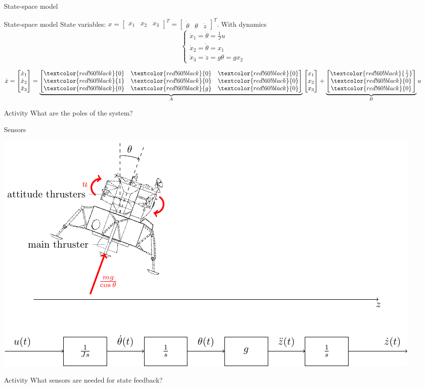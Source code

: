 \documentclass[presentation,aspectratio=169]{beamer}
\begin{document}
\begin{frame}[label={sec:org83769fd}]{State-space model}
\end{frame}
\begin{frame}[label={sec:org56fdffb}]{State-space model}
State variables: \(x = \begin{bmatrix} x_1 & x_2 & x_3 \end{bmatrix}^T = \begin{bmatrix} \dot{\theta} & \theta & \dot{z} \end{bmatrix}^T\). With dynamics
\[ \begin{cases} \dot{x}_1 =  \ddot{\theta} = \frac{1}{J} u\\ \dot{x}_2 = \dot{\theta} = x_1\\ \dot{x}_3 = \ddot{z} = g\theta = gx_2 \end{cases} \]

\[ \dot{x} = \begin{bmatrix} \dot{x}_1\\\dot{x}_2\\\dot{x}_3\end{bmatrix} = \underbrace{\begin{bmatrix} \textcolor{red!60!black}{0} & \textcolor{red!60!black}{0} &\textcolor{red!60!black}{0} \\\textcolor{red!60!black}{1} & \textcolor{red!60!black}{0}& \textcolor{red!60!black}{0}\\ \textcolor{red!60!black}{0}& \textcolor{red!60!black}{g} &\textcolor{red!60!black}{0} \end{bmatrix}}_{A} \begin{bmatrix} x_1\\x_2\\x_3\end{bmatrix} + \underbrace{\begin{bmatrix} \textcolor{red!60!black}{\frac{1}{J}} \\ \textcolor{red!60!black}{0} \\\textcolor{red!60!black}{0}  \end{bmatrix}}_{B} u \]

\pause

\alert{Activity} What are the poles of the system?
\end{frame}

\begin{frame}[label={sec:org7eda08e}]{Sensors}
\begin{center}
\includegraphics[width=0.8\linewidth]{../../figures/fig-apollo}
\end{center}
\alert{Activity} What sensors are needed for state feedback?
\end{frame}
\end{document}
